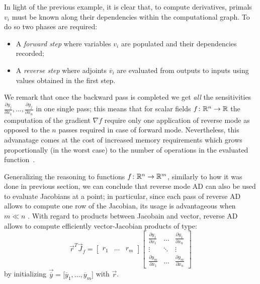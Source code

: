 \medskip
In light of the previous example, it is clear that, to compute derivatives, primals $v_i$ must be known along their dependencies within the computational graph. To do so two phases are required:
\begin{itemize}
	\item A \emph{forward step} where variables $v_i$ are populated and their dependencies recorded;
	\item A \emph{reverse step} where adjoints $\overline{v}_i$ are evaluated from outputs to inputs using values obtained in the first step.
\end{itemize}
We remark that once the backward pass is completed we get \emph{all} the sensitivities $\frac{\partial y_j}{\partial x_1}, \dots, \frac{\partial y_j}{\partial x_n}$ in one single pass; this means that for scalar fields $f \colon \mathbb{R}^n \to \mathbb{R}$ the computation of the gradient $\nabla f$ require only one application of reverse mode as opposed to the $n$ passes required in case of forward mode. Nevertheless, this advanatage comes at the cost of increased memory requirements which grows proportionally (in the worst case) to the number of operations in the evaluated function~\cite{Baydin:AD_survey}.

Generalizing the reasoning to functions $f \colon \mathbb{R}^n \to \mathbb{R}^m$, similarly to how it was done in previous section, we can conclude that reverse mode AD can also be used to evaluate Jacobians at a point; in particular, since each pass of reverse AD allows to compute one row of the Jacobian, its usage is advantageous when $m \ll n$ .
With regard to products between Jacobain and vector, reverse AD allows to compute efficiently vector-Jacobian products of type:
\begin{equation}
	\vec{r}^T \vec{J}_f =
	\begin{bmatrix}
		r_1 	& \dots  & r_m
	\end{bmatrix}
	\begin{bmatrix}
		\frac{\partial y_1}{\partial x_1} &  \dots  & \frac{\partial y_1}{\partial x_n}  \\
		\vdots							  & \ddots  & \vdots							 \\
		\frac{\partial y_m}{\partial x_1} &  \dots  & \frac{\partial y_m}{\partial x_n}
	\end{bmatrix}
\end{equation}
by initializing $\vec{\overline{y}}=\big[\overline{y}_1, \dots, \overline{y}_m \big]$ with $\vec{r}$.

